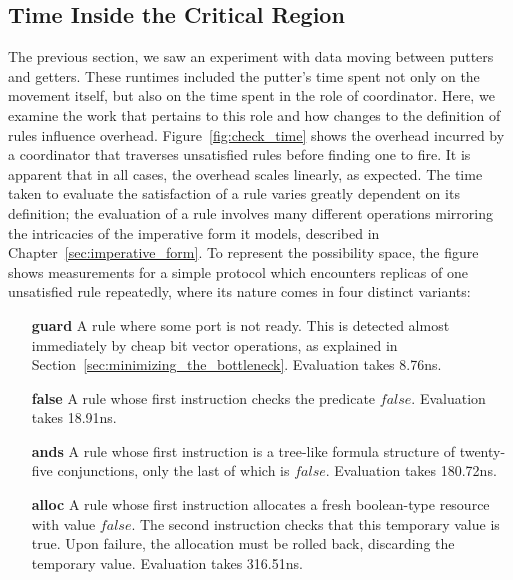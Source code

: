 \subsection{Time Inside the Critical Region}
The previous section, we saw an experiment with data moving between putters and getters. These runtimes included the putter's time spent not only on the movement itself, but also on the time spent in the role of coordinator. Here, we examine the work that pertains to this role and how changes to the definition of rules influence overhead. Figure~\ref{fig:check_time} shows the overhead incurred by a coordinator that traverses unsatisfied rules before finding one to fire. It is apparent that in all cases, the overhead scales linearly, as expected. The time taken to evaluate the satisfaction of a rule varies greatly dependent on its definition; the evaluation of a rule involves many different operations mirroring the intricacies of the imperative form it models, described in Chapter~\ref{sec:imperative_form}. To represent the possibility space, the figure shows measurements for a simple protocol which encounters replicas of one unsatisfied rule repeatedly, where its nature comes in four distinct variants:
\begin{enumerate}
	\item [\textbf{guard}] A rule where some port is not ready. This is detected almost immediately by cheap bit vector operations, as explained in Section~\ref{sec:minimizing_the_bottleneck}. Evaluation takes 8.76ns.
	
	\item [\textbf{false}] A rule whose first instruction checks the predicate $false$. Evaluation takes 18.91ns.
	\item [\textbf{ands}] A rule whose first instruction is a tree-like formula structure of twenty-five conjunctions, only the last of which is $false$. Evaluation takes 180.72ns.
	\item [\textbf{alloc}] A rule whose first instruction allocates a fresh boolean-type resource with value $false$. The second instruction checks that this temporary value is true. Upon failure, the allocation must be rolled back, discarding the temporary value. Evaluation takes 316.51ns.
\end{enumerate}


